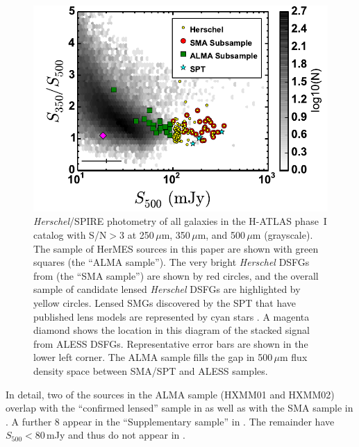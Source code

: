 \documentclass[iop]{emulateapj}
\begin{document}
\begin{figure}[!tbp] 
\includegraphics[width=\linewidth]{../Figures/spirecolflux.pdf}

\caption{ {\it Herschel}/SPIRE photometry of all galaxies in the H-ATLAS
phase~I catalog with S/N$ > 3$ at 250$\,\mu$m, 350$\,\mu$m, and 500$\,\mu$m
(grayscale).  The sample of HerMES sources in this paper are shown with green
squares (the ``ALMA sample'').  The very bright {\it Herschel} DSFGs from
\citet{Bussmann:2013lr} (the ``SMA sample'') are shown by red circles, and the
overall sample of candidate lensed {\it Herschel} DSFGs are highlighted by
yellow circles.  Lensed SMGs discovered by the SPT that have published lens
models are represented by cyan stars \citep{Hezaveh:2013fk}.  A magenta diamond
shows the location in this diagram of the stacked signal from ALESS DSFGs.
Representative error bars are shown in the lower left corner.  The ALMA sample
fills the gap in 500$\,\mu$m flux density space between SMA/SPT and ALESS
samples.} \label{fig:sample}

\end{figure}

In detail, two of the sources in the ALMA sample (HXMM01 and HXMM02) overlap
with the ``confirmed lensed'' sample in \citet{Wardlow:2013lr} as well as with
the SMA sample in \citet{Bussmann:2013lr}.  A further 8 appear in the
``Supplementary sample'' in \citet{Wardlow:2013lr}.  The remainder have
$S_{500} < 80\,$mJy and thus do not appear in \citet{Wardlow:2013lr}.
\end{document}
